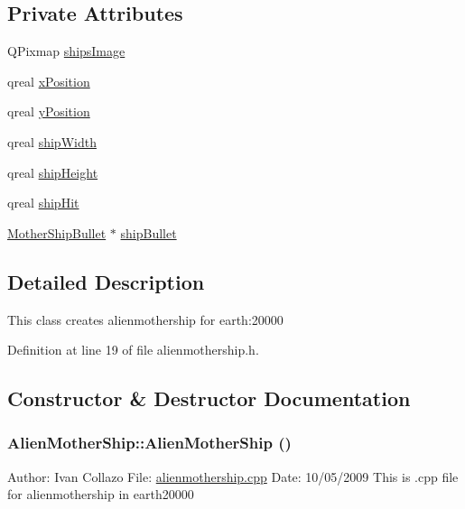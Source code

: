 \subsection*{Private Attributes}
\begin{DoxyCompactItemize}
\item 
QPixmap \hyperlink{class_alien_mother_ship_a61fef30fd35cb950ff5c23463da32adf}{shipsImage}
\item 
qreal \hyperlink{class_alien_mother_ship_a7c7c0ac12f0eb3add61f5d7a47fe93ee}{xPosition}
\item 
qreal \hyperlink{class_alien_mother_ship_af3b24eae146d655107298345d577d96d}{yPosition}
\item 
qreal \hyperlink{class_alien_mother_ship_af38d6c7fb520033527b5012f0ae60654}{shipWidth}
\item 
qreal \hyperlink{class_alien_mother_ship_acbf3b27133d490435d13650da53da1b0}{shipHeight}
\item 
qreal \hyperlink{class_alien_mother_ship_a06db4da9779e6346e7f05d3b39a8af0c}{shipHit}
\item 
\hyperlink{class_mother_ship_bullet}{MotherShipBullet} $\ast$ \hyperlink{class_alien_mother_ship_a102d1a84a81c500cbc435479d505af3b}{shipBullet}
\end{DoxyCompactItemize}


\subsection{Detailed Description}
This class creates alienmothership for earth:20000 

Definition at line 19 of file alienmothership.h.

\subsection{Constructor \& Destructor Documentation}
\hypertarget{class_alien_mother_ship_a981230852a6b57a58767302cc06dfc66}{
\subsubsection[{AlienMotherShip}]{\setlength{\rightskip}{0pt plus 5cm}AlienMotherShip::AlienMotherShip ()}}
\label{class_alien_mother_ship_a981230852a6b57a58767302cc06dfc66}
Author: Ivan Collazo File: \hyperlink{alienmothership_8cpp}{alienmothership.cpp} Date: 10/05/2009 This is .cpp file for alienmothership in earth20000

